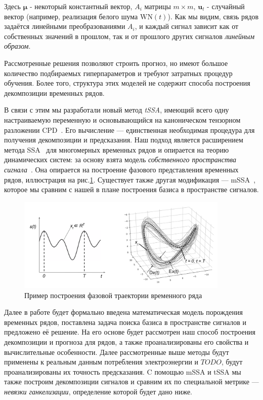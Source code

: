 		Здесь $ \boldsymbol{\mu} $ - некоторый константный вектор, $ A_i $ матрицы $ m \times m $, $ \mathbf{u}_t $ - случайный вектор (например, реализация белого шума $ \text{WN}(t) $). Как мы видим, связь рядов задаётся линейными преобразованиями $ A_i $, и каждый сигнал зависит как от собственных значений в прошлом, так и от прошлого других сигналов \textit{линейным образом}. 	
		
		Рассмотренные решения позволяют строить прогноз, но имеют большое количество подбираемых гиперпараметров и требуют затратных процедур обучения. Более того, структура этих моделей не содержит способа построения декомпозиции временных рядов. 
		
		В связи с этим мы разработали новый метод \emph{tSSA}, имеющий всего одну настраиваемую переменную и основывающийся на каноническом тензорном разложении CPD~\cite{kolda_tensors}. Его вычисление --- единственная необходимая процедура для получения декомпозиции и предсказания. Наш подход является расширением метода SSA~\cite{ecfb9dc578be43ae9ee8fc88b8ff9151} для многомерных временных рядов и опирается на теорию динамических систем: за основу взята модель \textit{собственного пространства сигнала}~\cite{1572261550523548160}. Она опирается на построение фазового представления временных рядов, иллюстрация на рис.\ref{pic:phase_traj}. Существует также другая модификация --- mSSA~\cite{mSSA_overview}, которое мы сравним с нашей в плане построения базиса в пространстве сигналов.
		
		\begin{figure}[h]
			\centering
			\includegraphics[width=0.9\textwidth, keepaspectratio]{../figs/phase_traj.png}
			\caption{Пример построения фазовой траектории временного ряда}\label{pic:phase_traj}
		\end{figure}
		
		Далее в работе будет формально введена математическая модель порождения временных рядов, поставлена задача поиска базиса в пространстве сигналов и предложено её решение. На его основе будет рассмотрен наш способ построения декомпозиции и прогноза для рядов, а также проанализированы его свойства и вычислительные особенности. Далее рассмотренные выше методы будут применены к реальным данным потребления электроэнергии и $ TODO $, будут проанализированы их точность предсказания. C помощью mSSA и tSSA мы также построим декомпозиции сигналов и сравним их по специальной метрике --- \emph{невязки ганкелизации}, определение которой будет дано ниже.
		 
